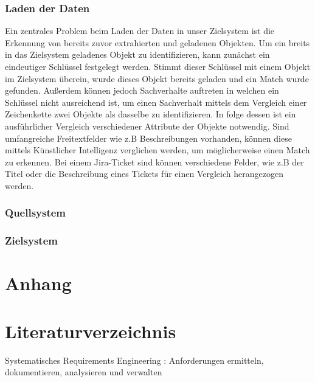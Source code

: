 \documentclass[10pt]{article}
\begin{document}
\subsubsection{Laden der Daten}
Ein zentrales Problem beim Laden der Daten in unser Zielsystem ist die Erkennung von bereits zuvor extrahierten und geladenen Objekten. Um ein breits in das Zielsystem geladenes Objekt zu identifizieren, kann zunächst ein eindeutiger Schlüssel festgelegt werden. Stimmt dieser Schlüssel mit einem Objekt im Zielsystem überein, wurde dieses Objekt bereits geladen und ein Match wurde gefunden. Außerdem können jedoch Sachverhalte auftreten in welchen ein Schlüssel nicht ausreichend ist, um einen Sachverhalt mittels dem Vergleich einer Zeichenkette zwei Objekte als dasselbe zu identifizieren. In folge dessen ist ein ausführlicher Vergleich verschiedener Attribute der Objekte notwendig. Sind umfangreiche Freitextfelder wie z.B Beschreibungen vorhanden, können diese mittels Künstlicher Intelligenz verglichen werden, um möglicherweise einen Match zu erkennen. Bei einem Jira-Ticket sind können verschiedene Felder, wie z.B der Titel oder die Beschreibung eines Tickets für einen Vergleich herangezogen werden.

\subsubsection{Quellsystem}
\subsubsection{Zielsystem}
\subsection{}
\section{Anhang}
\newpage
\section{Literaturverzeichnis}
Systematisches Requirements Engineering : Anforderungen ermitteln, dokumentieren, analysieren und verwalten 
\end{document}
